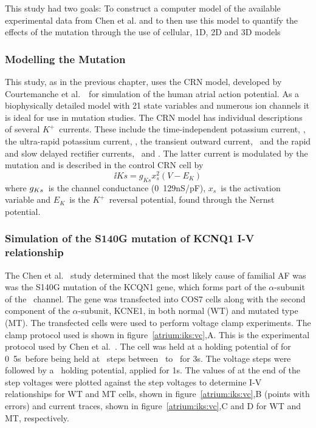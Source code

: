 This study had two goals: To construct a computer model of the available
experimental data from Chen et al. and to then use this model to quantify the
effects of the mutation through the use of cellular, 1D, 2D and 3D models

\subsubsection{Modelling the Mutation}

This study, as in the previous chapter, uses the CRN model, developed by
Courtemanche et al.~\cite{CRN98}\ for simulation of the human atrial action
potential.
As a biophysically detailed model with 21 state variables and numerous ion
channels it is ideal for use in mutation studies.
The CRN model has individual descriptions of several $K^{+}$\ currents.
These include the time-independent potassium current, , the ultra-rapid
potassium current, , the transient outward current, \ and the
rapid and slow delayed rectifier currents, \ and .
The latter current is modulated by the mutation and is described in the control
CRN cell by
\begin{equation}
\label{atrium:iks_con}
\ii{Ks} = g_{Ks}x_{s}^{2}\left(V-E_{K}\right)
\end{equation}
where $g_{\tiny{Ks}}$\ is the channel conductance (\unit{0.129}{nS/pF}), $x_{s}$\ is
the activation variable and $E_{K}$\ is the $K^{+}$\ reversal potential, found
through the Nernst potential.

\subsubsection{Simulation of the S140G mutation of KCNQ1 I-V relationship}

The Chen et al.~\cite{Chen2003} study determined that the most likely cause of
familial AF was was the S140G mutation of the KCQN1 gene, which forms part of
the $\alpha$-subunit of the \ channel.
The gene was transfected into COS7 cells along with the second component of
the $\alpha$-subunit, KCNE1, in both normal (WT) and mutated type (MT).
The transfected cells were used to perform voltage clamp experiments.
The clamp protocol used is shown in figure~\ref{atrium:iks:vc},A.
This is the experimental protocol used by Chen et al.~\cite{Chen2003}.
The cell was held at a holding potential of  for \unit{0.5}{s}\ before
being held at \ steps between \ to \ for \unit{3}{s}.
The voltage steps were followed by a \ holding potential, applied for
\unit{1}{s}.
The values of  at the end of the step voltages were plotted against the
step voltages to determine  I-V relationships for WT
and MT cells, shown in figure~\ref{atrium:iks:vc},B (points with errors) and
current traces, shown in figure~\ref{atrium:iks:vc},C and D for WT and MT,
respectively.

